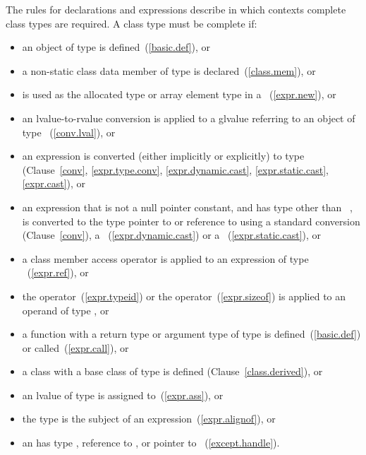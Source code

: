 \begin{note} The rules for declarations and expressions
describe in which contexts complete class types are required. A class
type  must be complete if:
\begin{itemize}
\item an object of type  is defined~(\ref{basic.def}), or
\item a non-static class data member of type  is
declared~(\ref{class.mem}), or
\item {} is used as the allocated type or array element type in a
~(\ref{expr.new}), or
\item an lvalue-to-rvalue conversion is applied to
a glvalue referring
to an object of type ~(\ref{conv.lval}), or
\item an expression is converted (either implicitly or explicitly) to
type  (Clause~\ref{conv}, \ref{expr.type.conv},
\ref{expr.dynamic.cast}, \ref{expr.static.cast}, \ref{expr.cast}), or
\item an expression that is not a null pointer constant, and has type
other than \cv{}~, is converted to the type pointer to 
or reference to  using a standard conversion
(Clause~\ref{conv}), a ~(\ref{expr.dynamic.cast}) or
a ~(\ref{expr.static.cast}), or
\item a class member access operator is applied to an expression of type
~(\ref{expr.ref}), or
\item the  operator~(\ref{expr.typeid}) or the
 operator~(\ref{expr.sizeof}) is applied to an operand of
type , or
\item a function with a return type or argument type of type 
is defined~(\ref{basic.def}) or called~(\ref{expr.call}), or
\item a class with a base class of type  is
defined (Clause~\ref{class.derived}), or
\item an lvalue of type  is assigned to~(\ref{expr.ass}), or
\item the type  is the subject of an
 expression~(\ref{expr.alignof}), or
\item an  has type , reference to
, or pointer to ~(\ref{except.handle}).
\end{itemize}
\end{note}

